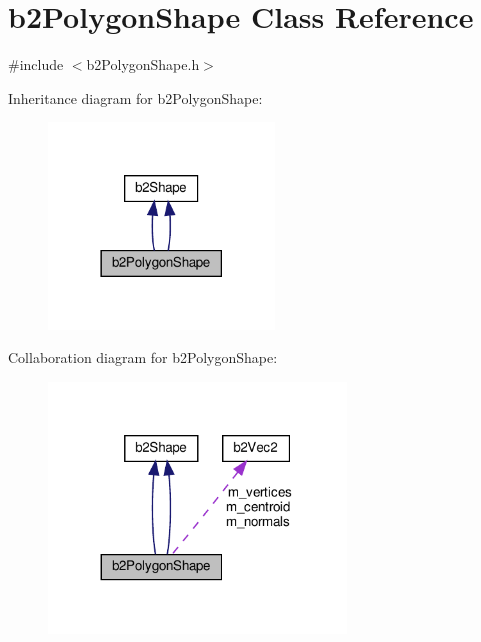 \hypertarget{classb2PolygonShape}{}\section{b2\+Polygon\+Shape Class Reference}
\label{classb2PolygonShape}


{\ttfamily \#include $<$b2\+Polygon\+Shape.\+h$>$}



Inheritance diagram for b2\+Polygon\+Shape\+:
\nopagebreak
\begin{figure}[H]
\begin{center}
\leavevmode
\includegraphics[width=170pt]{classb2PolygonShape__inherit__graph}
\end{center}
\end{figure}


Collaboration diagram for b2\+Polygon\+Shape\+:
\nopagebreak
\begin{figure}[H]
\begin{center}
\leavevmode
\includegraphics[width=224pt]{classb2PolygonShape__coll__graph}
\end{center}
\end{figure}
